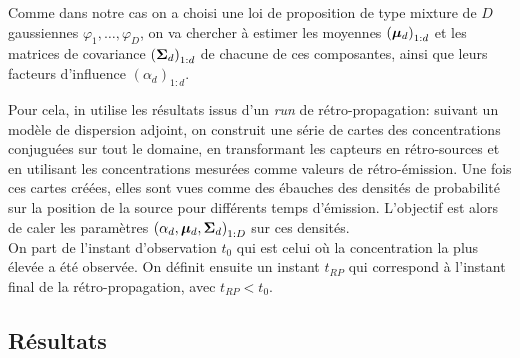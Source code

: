 Comme dans notre cas on a choisi une loi de proposition de type mixture de $D$ gaussiennes $\varphi_1, \dots, \varphi_D$, on va chercher à estimer les moyennes $\left({\bm{\mu}}_d\right)_{1:d}$ et les matrices de covariance $\left({\bm{\Sigma}}_d\right)_{1:d}$ de chacune de ces composantes, ainsi que leurs facteurs d'influence $\left(\alpha_d\right)_{1:d}$. 

Pour cela, in utilise les résultats issus d'un \textit{run} de rétro-propagation: suivant un modèle de dispersion adjoint, on construit une série de cartes des concentrations conjuguées sur tout le domaine, en transformant les capteurs en rétro-sources et en utilisant les concentrations mesurées comme valeurs de rétro-émission. Une fois ces cartes créées, elles sont vues comme des ébauches des densités de probabilité sur la position de la source pour différents temps d'émission. L'objectif est alors de caler les paramètres $\left(\alpha_d, {\bm{\mu}}_d,{\bm{\Sigma}}_d \right)_{1:D}$ sur ces densités.\\

On part de l'instant d'observation $t_0$ qui est celui où la concentration la plus élevée a été observée. On définit ensuite un instant $t_{RP}$ qui correspond à l'instant final de la rétro-propagation, avec $t_{RP} < t_0$. 

\subsection{Résultats}





